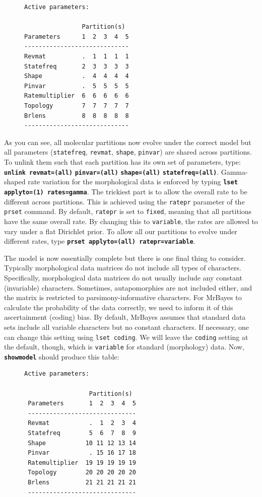 \documentclass[12pt]{book}
\newcommand{\ttt}[1]{\texttt{#1}}
\newcommand{\tb}[1]{\ttt{\textbf{#1}}}
\begin{document}
\begin{figure}[H]
\centering
\begin{BVerbatim}
Active parameters:
 
                Partition(s)
Parameters      1  2  3  4  5
-----------------------------
Revmat          .  1  1  1  1
Statefreq       2  3  3  3  3
Shape           .  4  4  4  4
Pinvar          .  5  5  5  5
Ratemultiplier  6  6  6  6  6
Topology        7  7  7  7  7
Brlens          8  8  8  8  8
-----------------------------
\end{BVerbatim}
\end{figure}

As you can see, all molecular partitions now evolve under the correct model but all parameters
(\texttt{statefreq}, \texttt{revmat}, \texttt{shape}, \texttt{pinvar}) are shared across
partitions.  To unlink them such that each partition has its own set of parameters, type:
\tb{unlink revmat=(all)} \tb{pinvar=(all)} \tb{shape=(all)} \tb{statefreq=(all)}. Gamma-shaped rate
variation for the morphological data is enforced by typing \tb{lset applyto=(1) rates=gamma}. The
trickiest part is to allow the overall rate to be different across partitions. This is achieved
using the \texttt{ratepr} parameter of the \texttt{prset} command. By default, \texttt{ratepr} is
set to \texttt{fixed}, meaning that all partitions have the same overall rate. By changing this to
\texttt{variable}, the rates are allowed to vary under a flat Dirichlet prior. To allow all our
partitions to evolve under different rates, type \tb{prset applyto=(all) ratepr=variable}.

The model is now essentially complete but there is one final thing to consider. Typically
morphological data matrices do not include all types of characters. Specifically, morphological
data matrices do not usually include any constant (invariable) characters. Sometimes,
autapomorphies are not included either, and the matrix is restricted to parsimony-informative
characters. For MrBayes to calculate the probability of the data correctly, we need to inform it of
this ascertainment (coding) bias. By default, MrBayes assumes that standard data sets include all
variable characters but no constant characters. If necessary, one can change this setting using
\texttt{lset coding}. We will leave the \texttt{coding} setting at the default, though, which is
\texttt{variable} for standard (morphology) data. Now, \tb{showmodel} should produce this table:

\begin{figure}[H]
\centering
\begin{BVerbatim}[fontsize=\small]
Active parameters:

                  Partition(s)
 Parameters       1  2  3  4  5
 ------------------------------
 Revmat           .  1  2  3  4
 Statefreq        5  6  7  8  9
 Shape           10 11 12 13 14
 Pinvar           . 15 16 17 18
 Ratemultiplier  19 19 19 19 19
 Topology        20 20 20 20 20
 Brlens          21 21 21 21 21
 ------------------------------
\end{BVerbatim}
\end{figure}
\end{document}
